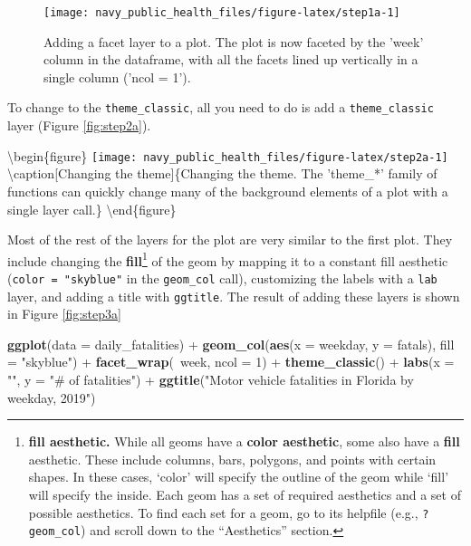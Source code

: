 \documentclass[]{tufte-book}
\newenvironment{Shaded}{}{}
\newcommand{\DataTypeTok}[1]{\textcolor[rgb]{0.56,0.13,0.00}{#1}}
\newcommand{\DecValTok}[1]{\textcolor[rgb]{0.25,0.63,0.44}{#1}}
\newcommand{\KeywordTok}[1]{\textcolor[rgb]{0.00,0.44,0.13}{\textbf{#1}}}
\newcommand{\NormalTok}[1]{#1}
\newcommand{\OperatorTok}[1]{\textcolor[rgb]{0.40,0.40,0.40}{#1}}
\newcommand{\StringTok}[1]{\textcolor[rgb]{0.25,0.44,0.63}{#1}}
\begin{document}
\begin{figure}
\texttt{[image: navy\_public\_health\_files/figure-latex/step1a-1]} \caption[Adding a facet layer to a plot]{Adding a facet layer to a plot. The plot is now faceted by the 'week' column in the dataframe, with all the facets lined up vertically in a single column ('ncol = 1').}\label{fig:step1a}
\end{figure}

To change to the \texttt{theme\_classic}, all you need to do is add a \texttt{theme\_classic} layer
(Figure \ref{fig:step2a}).

\textbackslash{}begin\{figure\}
\texttt{[image: navy\_public\_health\_files/figure-latex/step2a-1]} \textbackslash{}caption{[}Changing the theme{]}\{Changing the theme. The 'theme\_*' family of functions can quickly change many of the background elements of a plot with a single layer call.\}\label{fig:step2a}
\textbackslash{}end\{figure\}

Most of the rest of the layers for the plot are very similar to the first plot.
They include changing the \textbf{fill}\footnote{\textbf{fill aesthetic.} While all geoms have
  a \textbf{color aesthetic}, some also have a \textbf{fill} aesthetic. These include columns,
  bars, polygons, and points with certain shapes. In these cases, `color' will specify
  the outline of the geom while `fill' will specify the inside. Each geom has a set of
  required aesthetics and a set of possible aesthetics. To find each set for a geom,
  go to its helpfile (e.g., \texttt{?geom\_col}) and scroll down to the ``Aesthetics'' section.}
of the geom by mapping it to a constant fill
aesthetic (\texttt{color\ =\ "skyblue"} in the \texttt{geom\_col} call), customizing the labels with
a \texttt{lab} layer, and adding a title with \texttt{ggtitle}. The result of adding these layers
is shown in Figure \ref{fig:step3a}

\begin{Shaded}
\begin{Highlighting}[]
\KeywordTok{ggplot}\NormalTok{(}\DataTypeTok{data =}\NormalTok{ daily_fatalities) }\OperatorTok{+}\StringTok{ }\KeywordTok{geom_col}\NormalTok{(}\KeywordTok{aes}\NormalTok{(}\DataTypeTok{x =}\NormalTok{ weekday, }
    \DataTypeTok{y =}\NormalTok{ fatals), }\DataTypeTok{fill =} \StringTok{"skyblue"}\NormalTok{) }\OperatorTok{+}\StringTok{ }\KeywordTok{facet_wrap}\NormalTok{(}\OperatorTok{~}\NormalTok{week, }
    \DataTypeTok{ncol =} \DecValTok{1}\NormalTok{) }\OperatorTok{+}\StringTok{ }\KeywordTok{theme_classic}\NormalTok{() }\OperatorTok{+}\StringTok{ }\KeywordTok{labs}\NormalTok{(}\DataTypeTok{x =} \StringTok{""}\NormalTok{, }
    \DataTypeTok{y =} \StringTok{"# of fatalities"}\NormalTok{) }\OperatorTok{+}\StringTok{ }\KeywordTok{ggtitle}\NormalTok{(}\StringTok{"Motor vehicle fatalities in Florida by weekday, 2019"}\NormalTok{)}
\end{Highlighting}
\end{Shaded}
\end{document}
